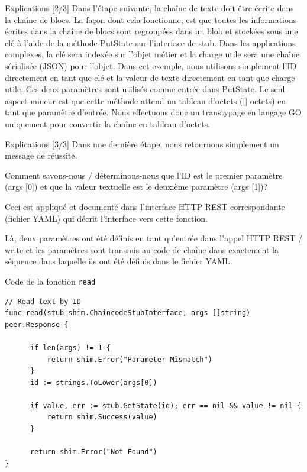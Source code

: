 \documentclass[presentation]{beamer}
\begin{document}
\begin{frame}[label={sec:orgaafafd1}]{Explications [2/3]}
Dans l'étape suivante, la chaîne de texte doit être écrite dans la chaîne de blocs. 
La façon dont cela fonctionne, est que toutes les informations écrites dans la chaîne de blocs sont 
regroupées dans un blob et stockées sous une clé à l'aide de la méthode PutState sur l'interface de stub. 
Dans les applications complexes, la clé sera indexée sur l'objet métier et la charge utile sera une chaîne  
sérialisée (JSON) pour l'objet. 
Dans cet exemple, nous utilisons simplement l'ID directement en tant que clé et la valeur de texte 
directement en tant que charge utile. Ces deux paramètres sont utilisés comme entrée dans PutState. 
Le seul aspect mineur est que cette méthode attend un tableau d'octets ([] octets) en tant que paramètre 
d'entrée. 
Nous effectuons donc un transtypage en langage GO uniquement pour convertir la chaîne en tableau d'octets.
\end{frame}

\begin{frame}[label={sec:org1aa20b8}]{Explications [3/3]}
Dans une dernière étape, nous retournons simplement un message de réussite.

Comment savons-nous / déterminons-nous que l'ID est le premier paramètre (args [0]) et que la valeur textuelle 
est le deuxième paramètre (args [1])? 

Ceci est appliqué et documenté dans l'interface HTTP REST correspondante (fichier YAML) qui décrit l'interface 
vers cette fonction. 

Là, deux paramètres ont été définis en tant qu'entrée dans l'appel HTTP REST / write et les paramètres sont 
transmis au code de chaîne dans exactement la séquence dans laquelle ils ont été définis dans le fichier YAML.
\end{frame}
\begin{frame}[fragile,label={sec:orgf0d4eae}]{Code de la fonction \texttt{read}}
 \begin{verbatim}
// Read text by ID
func read(stub shim.ChaincodeStubInterface, args []string) peer.Response {

      if len(args) != 1 {
	      return shim.Error("Parameter Mismatch")
      }
      id := strings.ToLower(args[0])

      if value, err := stub.GetState(id); err == nil && value != nil {
	      return shim.Success(value)
      }

      return shim.Error("Not Found")
}
\end{verbatim}
\end{frame}
\end{document}
